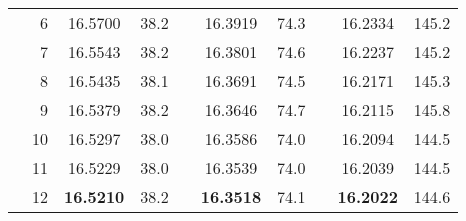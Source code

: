 \begin{table}[p!]
{\begin{tabular}{crcrlcrlcr}
                &  6 &      16.5700  & 38.2 &  &      16.3919  & 74.3 &  &      16.2334  & 145.2 \\
                &  7 &      16.5543  & 38.2 &  &      16.3801  & 74.6 &  &      16.2237  & 145.2 \\
                &  8 &      16.5435  & 38.1 &  &      16.3691  & 74.5 &  &      16.2171  & 145.3 \\
                &  9 &      16.5379  & 38.2 &  &      16.3646  & 74.7 &  &      16.2115  & 145.8 \\
                & 10 &      16.5297  & 38.0 &  &      16.3586  & 74.0 &  &      16.2094  & 144.5 \\
                & 11 &      16.5229  & 38.0 &  &      16.3539  & 74.0 &  &      16.2039  & 144.5 \\
                & 12 & {\bf 16.5210} & 38.2 &  & {\bf 16.3518} & 74.1 &  & {\bf 16.2022} & 144.6 \\
\hline
\end{tabular}}
\end{table}

